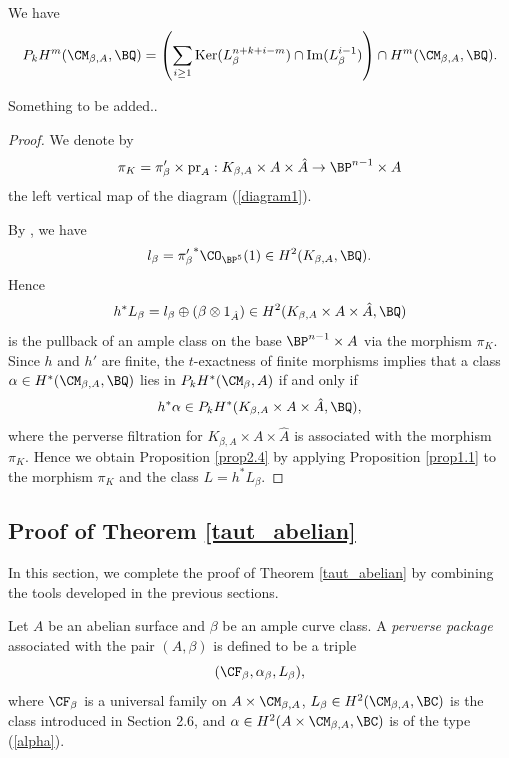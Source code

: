 \begin{prop}
\notready\label{prop2.4}
We have
\[
P_kH^m(\CM_{\beta,A}, \BQ) = \left( \sum_{i\geq 1} \mathrm{Ker}(L_\beta^{n+k+i-m}) \cap \mathrm{Im}(L_\beta^{i-1}) \right) \cap H^m(\CM_{\beta, A}, \BQ).
\]
\end{prop}

Something to be added..









\begin{proof}
We denote by
\[
\pi_K = \pi'_\beta \times \mathrm{pr}_A : K_{\beta, A} \times A \times \hat{A} \to \BP^{n-1}\times A
\]
the left vertical map of the diagram (\ref{diagram1}).

By \cite[Example 3.1]{Markman4}, we have
\[
l_\beta = {\pi'_\beta}^\ast \CO_{\BP^5}(1) \in H^2(K_{\beta,A}, \BQ).
\]
Hence
\[
h^*L_\beta = l_\beta \oplus (\beta\otimes 1_{\hat{A}}) \in H^2(K_{\beta, A} \times A \times \hat{A},\BQ)
\]
is the pullback of an ample class on the base $\BP^{n-1}\times A$ via the morphism $\pi_K$. Since $h$ and $h'$ are finite, the $t$-exactness of finite morphisms implies that a class $\alpha \in H^*(\CM_{\beta, A}, \BQ)$ lies in $P_kH^*(\CM_{\beta}, A)$ if and only if
\[
h^* \alpha \in P_kH^*(K_{\beta, A} \times A \times \hat{A},\BQ),
\]
where the perverse filtration for $K_{\beta, A} \times A \times \hat{A}$ is associated with the morphism $\pi_K$. Hence we obtain Proposition \ref{prop2.4} by applying Proposition \ref{prop1.1} to the morphism $\pi_K$ and the class $L = h^*L_\beta$.
\end{proof}

\subsection{Proof of Theorem \ref{taut_abelian}}
In this section, we complete the proof of Theorem \ref{taut_abelian} by combining the tools developed in the previous sections.

Let $A$ be an abelian surface and $\beta$ be an ample curve class. A \emph{perverse package} associated with the pair $(A, \beta)$ is defined to be a triple
\[
 (\CF_\beta, \alpha_\beta, L_\beta),
\]
where $\CF_\beta$ is a universal family on $A \times \CM_{\beta,A}$, $L_\beta \in H^2(\CM_{\beta,A}, \BC)$ is the class introduced in Section 2.6, and $\alpha \in H^2(A\times \CM_{\beta,A}, \BC)$ is of the type (\ref{alpha}).

